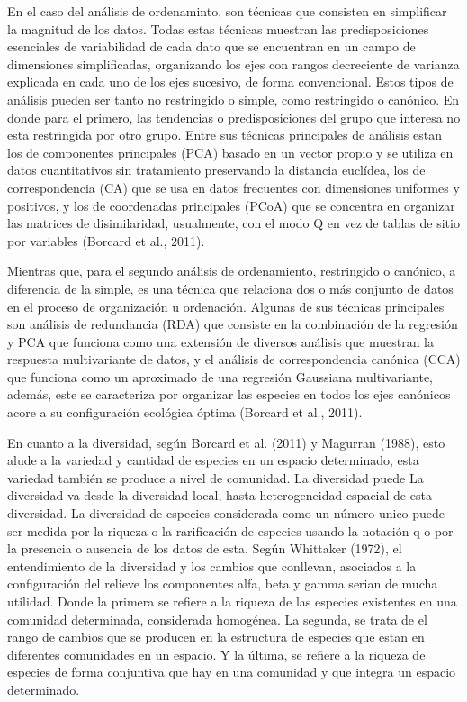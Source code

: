 \documentclass[11pt,]{article}
\begin{document}
En el caso del análisis de ordenaminto, son técnicas que consisten en
simplificar la magnitud de los datos. Todas estas técnicas muestran las
predisposiciones esenciales de variabilidad de cada dato que se
encuentran en un campo de dimensiones simplificadas, organizando los
ejes con rangos decreciente de varianza explicada en cada uno de los
ejes sucesivo, de forma convencional. Estos tipos de análisis pueden ser
tanto no restringido o simple, como restringido o canónico. En donde
para el primero, las tendencias o predisposiciones del grupo que
interesa no esta restringida por otro grupo. Entre sus técnicas
principales de análisis estan los de componentes principales (PCA)
basado en un vector propio y se utiliza en datos cuantitativos sin
tratamiento preservando la distancia euclídea, los de correspondencia
(CA) que se usa en datos frecuentes con dimensiones uniformes y
positivos, y los de coordenadas principales (PCoA) que se concentra en
organizar las matrices de disimilaridad, usualmente, con el modo Q en
vez de tablas de sitio por variables (Borcard et al., 2011).

Mientras que, para el segundo análisis de ordenamiento, restringido o
canónico, a diferencia de la simple, es una técnica que relaciona dos o
más conjunto de datos en el proceso de organización u ordenación.
Algunas de sus técnicas principales son análisis de redundancia (RDA)
que consiste en la combinación de la regresión y PCA que funciona como
una extensión de diversos análisis que muestran la respuesta
multivariante de datos, y el análisis de correspondencia canónica (CCA)
que funciona como un aproximado de una regresión Gaussiana
multivariante, además, este se caracteriza por organizar las especies en
todos los ejes canónicos acore a su configuración ecológica óptima
(Borcard et al., 2011).

En cuanto a la diversidad, según Borcard et al. (2011) y Magurran
(1988), esto alude a la variedad y cantidad de especies en un espacio
determinado, esta variedad también se produce a nivel de comunidad. La
diversidad puede La diversidad va desde la diversidad local, hasta
heterogeneidad espacial de esta diversidad. La diversidad de especies
considerada como un número unico puede ser medida por la riqueza o la
rarificación de especies usando la notación q o por la presencia o
ausencia de los datos de esta. Según Whittaker (1972), el entendimiento
de la diversidad y los cambios que conllevan, asociados a la
configuración del relieve los componentes alfa, beta y gamma serian de
mucha utilidad. Donde la primera se refiere a la riqueza de las especies
existentes en una comunidad determinada, considerada homogénea. La
segunda, se trata de el rango de cambios que se producen en la
estructura de especies que estan en diferentes comunidades en un
espacio. Y la última, se refiere a la riqueza de especies de forma
conjuntiva que hay en una comunidad y que integra un espacio
determinado.
\end{document}

